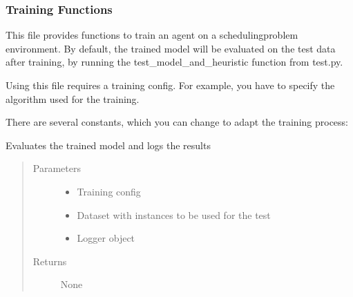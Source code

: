 \documentclass[letterpaper,10pt,english]{sphinxmanual}
\begin{document}
\subsubsection{Training Functions}
\label{\detokenize{agents.reinforcement_learning:module-agents.train}}\label{\detokenize{agents.reinforcement_learning:training-functions}}
\sphinxAtStartPar
This file provides functions to train an agent on a scheduling\sphinxhyphen{}problem environment.
By default, the trained model will be evaluated on the test data after training,
by running the test\_model\_and\_heuristic function from test.py.

\sphinxAtStartPar
Using this file requires a training config. For example, you have to specify the algorithm used for the training.

\sphinxAtStartPar
There are several constants, which you can change to adapt the training process:

\begin{fulllineitems}
\label{\detokenize{agents.reinforcement_learning:agents.train.final_evaluation}}
\sphinxAtStartPar
Evaluates the trained model and logs the results
\begin{quote}\begin{description}
\item[{Parameters}] \leavevmode\begin{itemize}
\item {} 
\sphinxAtStartPar
{} \textendash{} Training config

\item {} 
\sphinxAtStartPar
{} \textendash{} Dataset with instances to be used for the test

\item {} 
\sphinxAtStartPar
{} \textendash{} Logger object

\end{itemize}

\item[{Returns}] \leavevmode
\sphinxAtStartPar
None

\end{description}\end{quote}

\end{fulllineitems}
\end{document}
